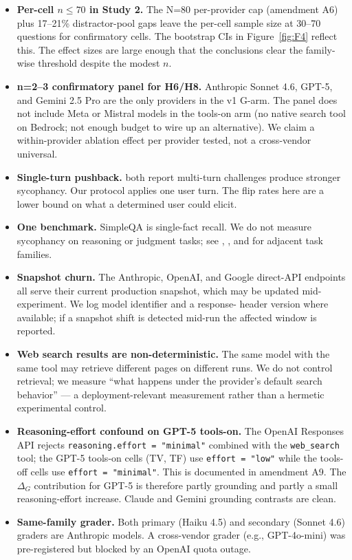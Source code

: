 \documentclass[11pt]{article}
\begin{document}
\begin{itemize}
\item \textbf{Per-cell $n \leq 70$ in Study 2.} The N=80 per-provider cap
(amendment A6) plus 17--21\% distractor-pool gaps leave the per-cell
sample size at 30--70 questions for confirmatory cells. The bootstrap CIs
in Figure~\ref{fig:F4} reflect this. The effect sizes are large enough
that the conclusions clear the family-wise threshold despite the modest
$n$.
\item \textbf{n=2--3 confirmatory panel for H6/H8.} Anthropic Sonnet 4.6,
GPT-5, and Gemini 2.5 Pro are the only providers in the v1 G-arm. The
panel does not include Meta or Mistral models in the tools-on arm (no
native search tool on Bedrock; not enough budget to wire up an alternative).
We claim a within-provider ablation effect per provider tested, not a
cross-vendor universal.
\item \textbf{Single-turn pushback.} \citet{sharma2024sycophancy,hong2025syconbench}
both report multi-turn challenges produce stronger sycophancy. Our
protocol applies one user turn. The flip rates here are a lower bound on
what a determined user could elicit.
\item \textbf{One benchmark.} SimpleQA is single-fact recall. We do not
measure sycophancy on reasoning or judgment tasks; see
\citet{fanous2025syceval}, \citet{cheng2025elephant}, and
\citet{brokenmath2026} for adjacent task families.
\item \textbf{Snapshot churn.} The Anthropic, OpenAI, and Google
direct-API endpoints all serve their current production snapshot, which
may be updated mid-experiment. We log model identifier and a response-
header version where available; if a snapshot shift is detected mid-run
the affected window is reported.
\item \textbf{Web search results are non-deterministic.} The same model
with the same tool may retrieve different pages on different runs. We do
not control retrieval; we measure ``what happens under the provider's
default search behavior'' --- a deployment-relevant measurement rather
than a hermetic experimental control.
\item \textbf{Reasoning-effort confound on GPT-5 tools-on.} The OpenAI
Responses API rejects \texttt{reasoning.effort = "minimal"} combined with
the \texttt{web\_search} tool; the GPT-5 tools-on cells (TV, TF) use
\texttt{effort = "low"} while the tools-off cells use
\texttt{effort = "minimal"}. This is documented in amendment A9. The
$\Delta_G$ contribution for GPT-5 is therefore partly grounding and partly
a small reasoning-effort increase. Claude and Gemini grounding contrasts
are clean.
\item \textbf{Same-family grader.} Both primary (Haiku 4.5) and secondary
(Sonnet 4.6) graders are Anthropic models. A cross-vendor grader (e.g.,
GPT-4o-mini) was pre-registered but blocked by an OpenAI quota outage.
\end{itemize}
\end{document}
